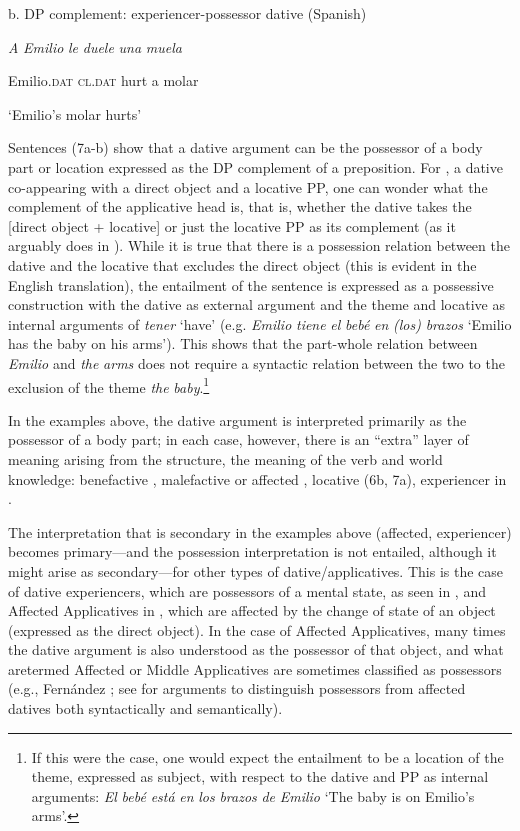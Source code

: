 \documentclass[output=paper,modfonts,nonflat]{langsci/langscibook}
\begin{document}
  b. DP complement: experiencer-possessor dative (Spanish)

  \textit{A} \textit{Emilio}      \textit{le}   \textit{duele} \textit{una} \textit{muela}     

  Emilio.\textsc{dat}  \textsc{cl.dat} hurt   a molar  

  ‘Emilio’s molar hurts’  

Sentences (7a-b) show that a dative argument can be the possessor of a body part or location expressed as the DP complement of a preposition. For , a dative co-appearing with a direct object and a locative PP, one can wonder what the complement of the applicative head is, that is, whether the dative takes the [direct object + locative] or just the locative PP as its complement (as it arguably does in ). While it is true that there is a possession relation between the dative and the locative that excludes the direct object (this is evident in the English translation), the entailment of the sentence is expressed as a possessive construction with the dative as external argument and the theme and locative as internal arguments of \textit{tener} ‘have’ (e.g. \textit{Emilio} \textit{tiene} \textit{el} \textit{bebé} \textit{en} \textit{(los)} \textit{brazos} ‘Emilio has the baby on his arms’).  This shows that the part-whole relation between \textit{Emilio} and \textit{the} \textit{arms} does not require a syntactic relation between the two to the exclusion of the theme \textit{the} \textit{baby}.\footnote{If this were the case, one would expect the entailment to be a location of the theme, expressed as subject, with respect to the dative and PP as internal arguments: \textit{El} \textit{bebé} \textit{está} \textit{en} \textit{los} \textit{brazos} \textit{de} \textit{Emilio} ‘The baby is on Emilio’s arms’.}     

In the examples above, the dative argument is interpreted primarily as the possessor of a body part; in each case, however, there is an “extra” layer of meaning arising from the structure, the meaning of the verb and world knowledge: benefactive , malefactive or affected , locative (6b, 7a), experiencer in . 

The interpretation that is secondary in the examples above (affected, experiencer) becomes primary—and the possession interpretation is not entailed, although it might arise as secondary—for other types of dative/applicatives. This is the case of dative experiencers, which are possessors of a mental state, as seen in , and Affected Applicatives in , which are affected by the change of state of an object (expressed as the direct object). In the case of Affected Applicatives, many times the dative argument is also understood as the possessor of that object, and what aretermed Affected or Middle Applicatives are sometimes classified as possessors (e.g., Fernández \citealt{Alcalde2014}; see \citealt{Cuervo2003} for arguments to distinguish possessors from affected datives both syntactically and semantically). 
\end{document}
